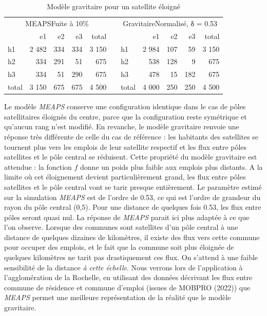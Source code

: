\documentclass[
  10pt,
  a4paper,
  numbers=noendperiod,
  DIV=9]{scrartcl}
\begin{document}
\hypertarget{tbl-fluxgrav2}{}
\begin{longtable}{lrrrrrlrrrr}
\caption{\label{tbl-fluxgrav2}Modèle gravitaire pour un satellite éloigné }\tabularnewline

\toprule
\multicolumn{5}{c}{MEAPSFuite à 10\%} &  & \multicolumn{5}{c}{GravitaireNormalisé, δ = 0.53} \\ 
\cmidrule(lr){1-5} \cmidrule(lr){7-11}
 & e1 & e2 & e3 & total &   &  & e1 & e2 & e3 & total \\ 
\midrule
h1 & 2 482 & 334 & 334 & 3 150 &  & h1 & 2 984 & 107 & 59 & 3 150 \\ 
h2 & 334 & 291 & 51 & 675 &  & h2 & 538 & 128 & 9 & 675 \\ 
h3 & 334 & 51 & 290 & 675 &  & h3 & 478 & 15 & 182 & 675 \\ 
total & 3 150 & 675 & 675 & 4 500 &  & total & 4 000 & 250 & 250 & 4 500 \\ 
\bottomrule
\end{longtable}

Le modèle \emph{MEAPS} conserve une configuration identique dans le cas
de pôles satellitaires éloignés du centre, parce que la configuration
reste symétrique et qu'aucun rang n'est modifié. En revanche, le modèle
gravitaire renvoie une réponse très différente de celle du cas de
référence : les habitants des satellites se tournent plus vers les
emplois de leur satellite respectif et les flux entre pôles satellites
et le pôle central se réduisent. Cette propriété du modèle gravitaire
est attendue : la fonction \(f\) donne un poids plus faible aux emplois
plus distants. A la limite où cet éloignement devient particulièrement
grand, les flux entre pôles satellites et le pôle central vont se tarir
presque entièrement. Le paramètre estimé sur la simulation \emph{MEAPS}
est de l'ordre de 0.53, ce qui est l'ordre de grandeur du rayon du pôle
central (0,5). Pour une distance de quelques fois 0.53, les flux entre
pôles seront quasi nul. La réponse de \emph{MEAPS} parait ici plus
adaptée à ce que l'on observe. Lorsque des communes sont satellites d'un
pôle central à une distance de quelques dizaines de kilomètres, il
existe des flux vers cette commune pour occuper des emplois, et le fait
que la commune soit plus éloignée de quelques kilomètres ne tarit pas
drastiquement ces flux. On s'attend à une faible sensibilité de la
distance \emph{à cette échelle}. Nous verrons lors de l'application à
l'agglomération de la Rochelle, en utilisant des données décrivant les
flux entre commune de résidence et commune d'emploi (issues de MOBPRO
(2022)) que \emph{MEAPS} permet une meilleure représentation de la
réalité que le modèle gravitaire.
\end{document}
